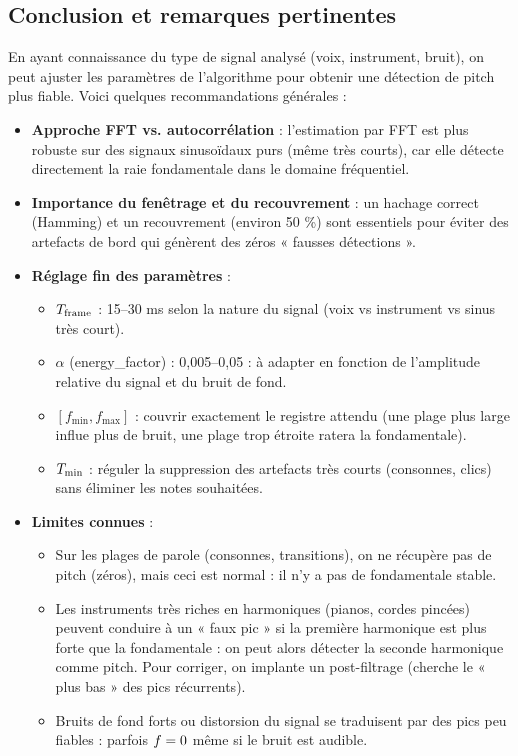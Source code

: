 \subsection{Conclusion et remarques pertinentes}
En ayant connaissance du type de signal analysé (voix, instrument, bruit), on peut ajuster les paramètres de l’algorithme pour obtenir une détection de pitch plus fiable. Voici quelques recommandations générales :

\begin{itemize}
  \item \textbf{Approche FFT vs. autocorrélation }: l’estimation par FFT est plus robuste sur des signaux sinusoïdaux purs (même très courts), car elle détecte directement la raie fondamentale dans le domaine fréquentiel.  
  \item \textbf{Importance du fenêtrage et du recouvrement }: un hachage correct (Hamming) et un recouvrement (environ 50 \%) sont essentiels pour éviter des artefacts de bord qui génèrent des zéros « fausses détections ».  
  \item \textbf{Réglage fin des paramètres }:  
    \begin{itemize}
      \item \(T_\mathrm{frame}\) : 15–30 ms selon la nature du signal (voix vs instrument vs sinus très court).  
      \item \(\alpha\) (energy\_factor) : 0,005–0,05 : à adapter en fonction de l’amplitude relative du signal et du bruit de fond.  
      \item \([f_{\min}, f_{\max}]\) : couvrir exactement le registre attendu (une plage plus large influe plus de bruit, une plage trop étroite ratera la fondamentale).  
      \item \(T_\mathrm{min}\) : réguler la suppression des artefacts très courts (consonnes, clics) sans éliminer les notes souhaitées.  
    \end{itemize}
  \item \textbf{Limites connues } :  
    \begin{itemize}
      \item Sur les plages de parole (consonnes, transitions), on ne récupère pas de pitch (zéros), mais ceci est normal : il n’y a pas de fondamentale stable.  
      \item Les instruments très riches en harmoniques (pianos, cordes pincées) peuvent conduire à un « faux pic » si la première harmonique est plus forte que la fondamentale : on peut alors détecter la seconde harmonique comme pitch. Pour corriger, on implante un post-filtrage (cherche le « plus bas » des pics récurrents).  
      \item Bruits de fond forts ou distorsion du signal se traduisent par des pics peu fiables : parfois \(f=0\) même si le bruit est audible.  
    \end{itemize}
\end{itemize}
